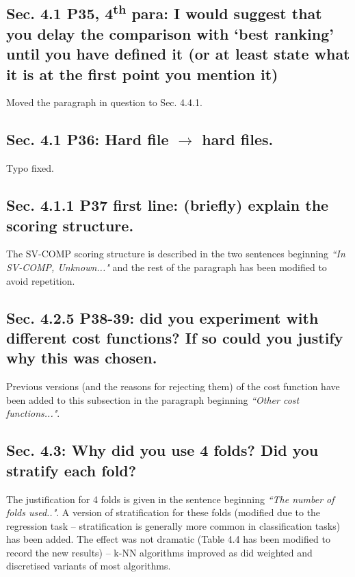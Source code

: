 \documentclass[]{article}
\newcommand{\ts}{\textsuperscript}
\begin{document}
\subsection{Sec. 4.1 P35, 4\ts{th} para: I would suggest that you delay the comparison with `best ranking' until you have defined it (or at least state what it is at the first point you mention it)}

Moved the paragraph in question to Sec. 4.4.1.

\subsection{Sec. 4.1 P36: Hard file $\rightarrow$ hard files.}

Typo fixed.

\subsection{Sec. 4.1.1 P37 first line: (briefly) explain the scoring structure.}

The SV-COMP scoring structure is described in the two sentences beginning \emph{``In SV-COMP, Unknown..."} and the rest of the paragraph has been modified to avoid repetition. 

\subsection{Sec. 4.2.5 P38-39: did you experiment with different cost functions? If so could you justify why this was chosen.}

Previous versions (and the reasons for rejecting them) of the cost function have been added to this subsection in the paragraph beginning \emph{``Other cost functions..."}.

\subsection{Sec. 4.3: Why did you use 4 folds? Did you stratify each fold?}

The justification for 4 folds is given in the sentence beginning \emph{``The number of folds used.."}. A version of stratification for these folds (modified due to the regression task -- stratification is generally more common in classification tasks) has been added. The effect was not dramatic (Table 4.4 has been modified to record the new results) -- k-NN algorithms improved as did weighted and discretised variants of most algorithms.
\end{document}
